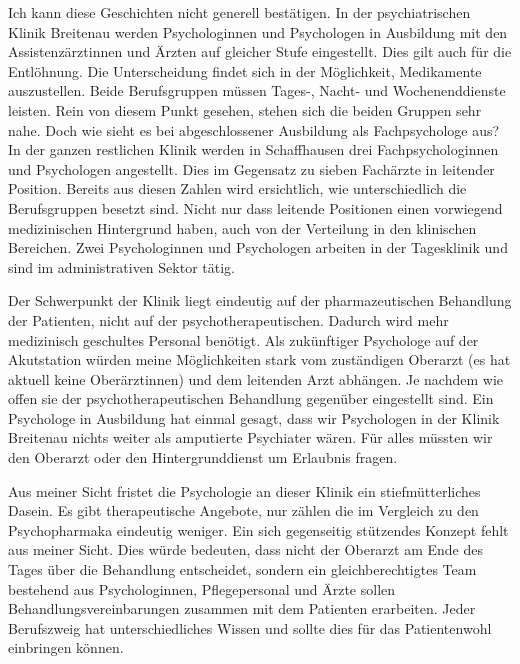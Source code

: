 Ich kann diese Geschichten nicht generell bestätigen. In der psychiatrischen Klinik Breitenau werden Psychologinnen und Psychologen in Ausbildung mit den Assistenzärztinnen und Ärzten auf gleicher Stufe eingestellt. Dies gilt auch für die Entlöhnung. Die Unterscheidung findet sich in der Möglichkeit,  Medikamente auszustellen. Beide Berufsgruppen müssen Tages-, Nacht- und Wochenenddienste leisten. Rein von diesem Punkt gesehen, stehen sich die beiden Gruppen sehr nahe. Doch wie sieht es bei abgeschlossener Ausbildung als Fachpsychologe aus? In der ganzen restlichen Klinik werden in Schaffhausen drei Fachpsychologinnen und Psychologen angestellt. Dies im Gegensatz zu sieben Fachärzte in leitender Position. Bereits aus diesen Zahlen wird ersichtlich, wie unterschiedlich die Berufsgruppen besetzt sind. Nicht nur dass leitende Positionen einen vorwiegend medizinischen Hintergrund haben, auch von der Verteilung in den klinischen Bereichen. Zwei Psychologinnen und Psychologen arbeiten in der Tagesklinik und sind im administrativen Sektor tätig. 

Der Schwerpunkt der Klinik liegt eindeutig auf der pharmazeutischen Behandlung der Patienten, nicht auf der psychotherapeutischen. Dadurch wird mehr medizinisch geschultes Personal benötigt. Als zukünftiger Psychologe auf der Akutstation würden meine Möglichkeiten stark vom zuständigen Oberarzt (es hat aktuell keine Oberärztinnen) und dem leitenden Arzt abhängen. Je nachdem wie offen sie der psychotherapeutischen Behandlung gegenüber eingestellt sind. Ein Psychologe in Ausbildung hat einmal gesagt, dass wir Psychologen in der Klinik Breitenau nichts weiter als amputierte Psychiater wären. Für alles müssten wir den Oberarzt oder den Hintergrunddienst um Erlaubnis fragen. 

Aus meiner Sicht fristet die Psychologie an dieser Klinik ein stiefmütterliches Dasein. Es gibt therapeutische Angebote, nur zählen die im Vergleich zu den Psychopharmaka eindeutig weniger. Ein sich gegenseitig stützendes Konzept fehlt aus meiner Sicht. Dies würde bedeuten, dass nicht der Oberarzt am Ende des Tages über die Behandlung entscheidet, sondern ein gleichberechtigtes Team bestehend aus Psychologinnen, Pflegepersonal und Ärzte sollen Behandlungsvereinbarungen zusammen mit dem Patienten erarbeiten. Jeder Berufszweig hat unterschiedliches Wissen und sollte dies für das Patientenwohl einbringen können. 

